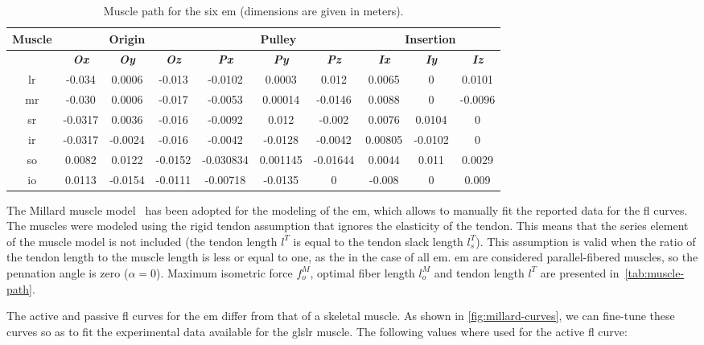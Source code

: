 \documentclass[11pt,a4paper,draft=false]{report}
\begin{document}
\begin{table}[h]
  \caption{Muscle path for the six \gls{em} (dimensions are given in
    meters).}\label{tab:muscle-path}
  \begin{tabular}{@{}cccccccccc@{}}
    \toprule
    \textbf{Muscle}
    & \multicolumn{3}{c}{\textbf{Origin}}
    & \multicolumn{3}{c}{\textbf{Pulley}}
    & \multicolumn{3}{c}{\textbf{Insertion}} \\
    \midrule
    & \textit{\textbf{Ox}} & \textit{\textbf{Oy}} & \textit{\textbf{Oz}}
    & \textit{\textbf{Px}} & \textit{\textbf{Py}} & \textit{\textbf{Pz}}
    & \textit{\textbf{Ix}} & \textit{\textbf{Iy}} & \textit{\textbf{Iz}} \\
    \midrule
    \gls{lr} & -0.034 & 0.0006 & -0.013 & -0.0102 & 0.0003 & 0.012 & 0.0065 & 0 & 0.0101 \\
    \gls{mr} & -0.030 & 0.0006 & -0.017 & -0.0053 & 0.00014 & -0.0146 & 0.0088 & 0 & -0.0096 \\
    \gls{sr} & -0.0317 & 0.0036 & -0.016 & -0.0092 & 0.012 & -0.002 & 0.0076 & 0.0104 & 0 \\
    \gls{ir} & -0.0317 & -0.0024 & -0.016 & -0.0042 & -0.0128 & -0.0042 & 0.00805 & -0.0102 & 0 \\
    \gls{so} & 0.0082 & 0.0122 & -0.0152 & -0.030834 & 0.001145 & -0.01644 & 0.0044 & 0.011 & 0.0029 \\
    \gls{io} & 0.0113 & -0.0154 & -0.0111 & -0.00718 & -0.0135 & 0 & -0.008 & 0 & 0.009 \\
    \bottomrule
  \end{tabular}
\end{table}

The Millard muscle model~\cite{Millard2013} has been adopted for the modeling of
the \gls{em}, which allows to manually fit the reported data for the \gls{fl}
curves. The muscles were modeled using the rigid tendon assumption that ignores
the elasticity of the tendon. This means that the series element of the muscle
model is not included (the tendon length $l^T$ is equal to the tendon slack
length $l_s^T$). This assumption is valid when the ratio of the tendon length to
the muscle length is less or equal to one, as the in the case of all
\gls{em}. \gls{em} are considered parallel-fibered muscles, so the pennation
angle is zero ($\alpha = 0$). Maximum isometric force $f_o^M$, optimal fiber
length $l_o^M$ and tendon length $l^T$ are presented
in~\autoref{tab:muscle-path}.

The active and passive \gls{fl} curves for the \gls{em} differ from that of a
skeletal muscle. As shown in \autoref{fig:millard-curves}, we can fine-tune
these curves so as to fit the experimental data available for the gls{lr}
muscle. The following values where used for the active \gls{fl} curve:
\end{document}
